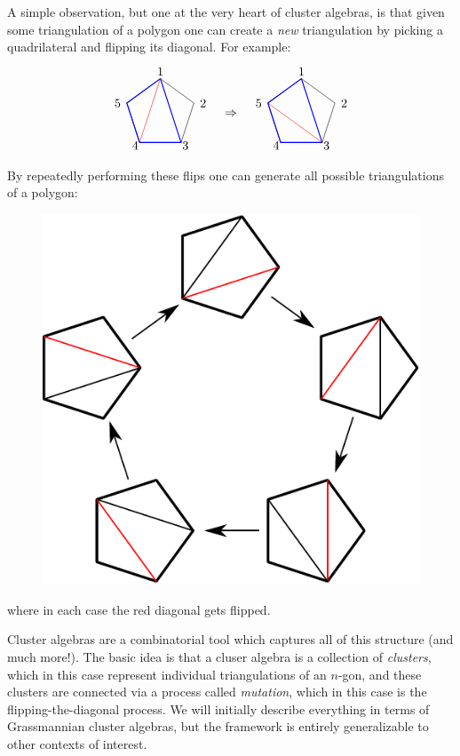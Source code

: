 \documentclass[11pt]{article}
\def\drawLabeledPentagon{
\coordinate (P1) at (90:1);
\coordinate (P2) at (18:1);
\coordinate (P3) at (306:1);
\coordinate (P4) at (234:1);
\coordinate (P5) at (162:1);
\draw (P1) -- (P2) -- (P3) -- (P4) -- (P5) -- cycle;
\draw (0,1.2) node {1};
\draw (1,.3) node[anchor=west] {2};
\draw (.5,-.9) node[anchor=west] {3};
\draw (-.5,-.9) node[anchor=east] {4};
\draw (-1,.3) node[anchor=east] {5};
}
\begin{document}
A simple observation, but one at the very heart of cluster algebras, is that given some triangulation of a polygon one can create a \emph{new} triangulation by picking a quadrilateral and flipping its diagonal. For example:
\begin{equation}
\begin{tikzpicture}
  \drawLabeledPentagon
  \draw[color=blue, thick] (P1) -- (P3) -- (P4) -- (P5) -- cycle;
  \draw[color=red] (P1) -- (P4);
  \draw (2,0) node {$\Rightarrow$};
\begin{scope}[xshift = 4cm]
  \drawLabeledPentagon
  \draw[color=blue, thick] (P1) -- (P3) -- (P4) -- (P5) -- cycle;
  \draw[color=red] (P5) -- (P3);
\end{scope}
\end{tikzpicture} 
\end{equation}
By repeatedly performing these flips one can generate all possible triangulations of a polygon:
\pagebreak
\begin{figure}[h!]
  \centering
  \includegraphics[scale=0.6]{pentagon-triangulations}
\end{figure}

\noindent where in each case the red diagonal gets flipped. 

Cluster algebras are a combinatorial tool which captures all of this structure (and much more!). The basic idea is that a cluser algebra is a collection of \emph{clusters}, which in this case represent individual triangulations of an $n$-gon, and these clusters are connected via a process called \emph{mutation}, which in this case is the flipping-the-diagonal process. We will initially describe everything in terms of Grassmannian cluster algebras, but the framework is entirely generalizable to other contexts of interest.
\end{document}
